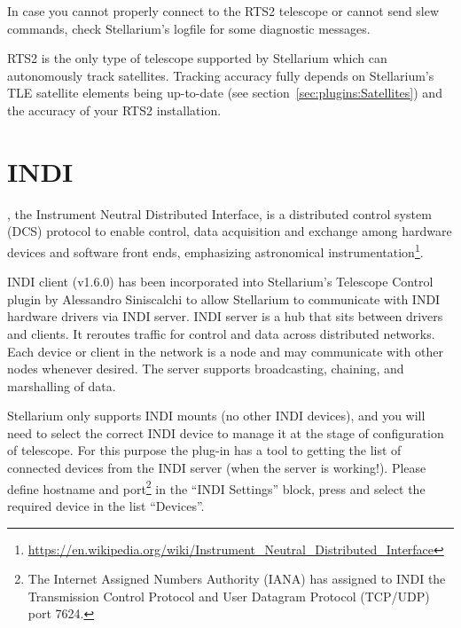 In case you cannot properly connect to the RTS2 telescope or cannot send slew commands, 
check Stellarium's logfile  for some diagnostic messages.

RTS2 is the only type of telescope supported by Stellarium which can autonomously track satellites. 
Tracking accuracy fully depends on Stellarium's TLE satellite elements being up-to-date 
(see section~\ref{sec:plugins:Satellites}) and the accuracy of your RTS2 installation.

\section{INDI}
\label{sec:plugins:TelescopeControl:INDI}
, the Instrument Neutral Distributed Interface, 
is a distributed control system (DCS) protocol to enable control, data acquisition 
and exchange among hardware devices and software front ends, emphasizing astronomical 
instrumentation\footnote{\url{https://en.wikipedia.org/wiki/Instrument_Neutral_Distributed_Interface}}.
 
INDI client (v1.6.0) has been incorporated into Stellarium's Telescope Control plugin 
by Alessandro Siniscalchi to allow Stellarium to communicate with INDI hardware drivers via INDI server. 
INDI server is a hub that sits between drivers and clients. It reroutes traffic for control and data across distributed networks. 
Each device or client in the network is a node and may communicate with other nodes whenever desired. 
The server supports broadcasting, chaining, and marshalling of data.

Stellarium only supports INDI mounts (no other INDI devices), and you will need to select the correct INDI device 
to manage it at the stage of configuration of telescope. 
For this purpose the plug-in has a tool to getting the list of connected devices from the INDI server (when the server is working!). 
Please define hostname and port\footnote{The Internet Assigned Numbers Authority (IANA) has assigned to INDI 
the Transmission Control Protocol and User Datagram Protocol (TCP/UDP) port 7624.} 
in the ``INDI Settings'' block, press  and select the required device in the list ``Devices''. 


